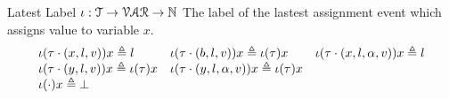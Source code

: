 %
Latest Label $\iota : \mathcal{T} \to \mathcal{VAR} \to \mathbb{N}$ 
The label of the lastest assignment event which assigns value to variable $x$.
\[
  \begin{array}{lll}
\iota(\mathtt{\tau} \cdot (x, l, v) ) x \triangleq l
&
\iota(\mathtt{\tau} \cdot (b, l, v)) x \triangleq \iota(\mathtt{\tau}) x
&
\iota(\mathtt{\tau} \cdot (x, l, \alpha, v)) x \triangleq l
\\
\iota(\mathtt{\tau}  \cdot (y, l, v)) x \triangleq \iota(\mathtt{\tau} ) x
&
\iota(\mathtt{\tau} \cdot (y, l, \alpha, v)) x \triangleq \iota(\mathtt{\tau} ) x
\\
\iota(\cdot) x \triangleq \bot
&&
\end{array}
\]
%
%


